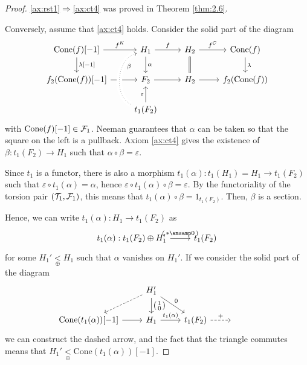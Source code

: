\begin{proof}
  \ref{ax:rst1}$\Rightarrow$\ref{ax:ct4} was proved in Theorem \ref{thm:2.6}.

  Conversely, assume that
  \ref{ax:ct4} holds. Consider the solid part of the diagram
  \begin{equation*}
    \begin{tikzcd}
      \mathrm{Cone}(f)[-1]\arrow{r}{f^K}\arrow{d}{\lambda[-1]}
        & H_1\arrow{r}{f}\arrow{d}{\alpha}
          & H_2\arrow{r}{f^C}\arrow[equal]{d}
            & \mathrm{Cone}(f)\arrow{d}{\lambda}\\
       f_2(\mathrm{Cone}(f))[-1]\arrow{r}
        & F_2\arrow{r}
          & H_2\arrow{r}
            &  f_2(\mathrm{Cone}(f))\\
        &  t_1(F_2)\arrow{u}{\varepsilon}\arrow[dotted, crossing over, bend left=70]{uu}[near end,']{\beta}
        & &
    \end{tikzcd}
  \end{equation*}
  with $\mathrm{Cone}(f)[-1]\in\mathcal{F}_1$. Neeman \cite[Lemma~1.4.3]{Nee01} guarantees
  that $\alpha$ can be taken so that the square on the left is a pullback. Axiom \ref{ax:ct4}
  gives the existence of $\beta: t_1(F_2)\to H_1$ such that $\alpha\circ\beta=\varepsilon$.

  Since $ t_1$ is a functor, there is also a morphism
  $ t_1(\alpha): t_1(H_1)=H_1\to  t_1(F_2)$ such that
  $\varepsilon\circ t_1(\alpha)=\alpha$, hence
  $\varepsilon\circ t_1(\alpha)\circ\beta = \varepsilon$. By the functoriality of
  the torsion pair $(\mathcal{T}_1,\mathcal{F}_1)$, this means that
  $ t_1(\alpha)\circ\beta=1_{ t_1(F_2)}$. Then, $\beta$ is a section.

  Hence, we can write $ t_1(\alpha):H_1\to  t_1(F_2)$
  as
  \begin{equation*}
    \begin{tikzcd}
       t_1(\alpha): t_1(F_2)\oplus H_1'
      \arrow{r}{
          \begin{psmallmatrix}
            \ast \amsamp 0
          \end{psmallmatrix}
          }
        &  t_1(F_2)
    \end{tikzcd}
  \end{equation*}
  for some $H_1'\underset{\oplus}{<} H_1$ such that
  $\alpha$ vanishes on $H_1'$. If we consider the solid part of the diagram
  \begin{equation*}
    \begin{tikzcd}
      & H_1'\arrow[dashed]{dl}
      \arrow{d}{
        \begin{psmallmatrix}
          1 \\ 0
        \end{psmallmatrix}
      }\arrow{dr}{0}
        & & &\\
      \mathrm{Cone}( t_1(\alpha))[-1]\arrow{r}
        & H_1\arrow{r}{ t_1(\alpha)}
          &  t_1(F_2)\arrow[dashed]{r}{+}
            & {}
    \end{tikzcd}
  \end{equation*}
  we can construct the dashed arrow, and the fact that the triangle commutes means
  that $H_1'\underset{\oplus}{<}\mathrm{Cone}( t_1(\alpha))[-1]$.


\end{proof}
